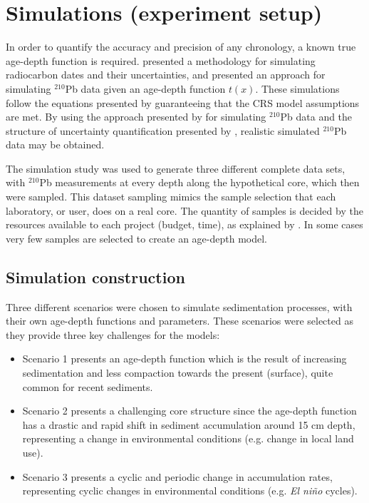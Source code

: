 \documentclass [10pt] {article}
\begin{document}
\section{Simulations (experiment setup)}

	In order to quantify the accuracy and precision of any chronology, a known true age-depth function is required.
\citet{Blaauw2018} presented a methodology for simulating radiocarbon dates and their uncertainties, and \citet{Aquino2018} presented an approach for simulating $^{210}$Pb data given an age-depth function $t(x)$.
These simulations follow the equations presented by \cite{Appleby1978, Robbins1978} guaranteeing that the CRS model assumptions are met. 
By using the approach presented by \citet{Aquino2018} for simulating $^{210}$Pb data and the structure of uncertainty quantification presented by \citet{Blaauw2018}, realistic simulated $^{210}$Pb data may be obtained.

	The simulation study was used to generate three different complete data sets, with $^{210}$Pb measurements at every depth along the hypothetical core, which then were sampled. 
This dataset sampling mimics the sample selection that each laboratory, or user, does on a real core.
The quantity of samples is decided by the resources available to each project (budget, time), as explained by \citet{Blaauw2018}. 
In some cases very few samples are selected to create an age-depth model.

\subsection{Simulation construction}\label{sec:SimConst}

Three different scenarios were chosen to simulate sedimentation processes, with their own age-depth functions and parameters. 
These scenarios were selected as they provide three key challenges for the models:
\begin{itemize}
\item Scenario 1 presents an age-depth function which is the result of increasing sedimentation and less compaction towards the present (surface), quite common for recent sediments. 
	
\item Scenario 2 presents a challenging core structure since the age-depth function has a drastic and rapid shift in sediment accumulation around 15 cm depth, representing a change in environmental conditions (e.g. change in local land use).
 
\item Scenario 3 presents a cyclic and periodic change in accumulation rates, representing cyclic changes in environmental conditions (e.g. \textit{El ni\~no} cycles). 
\end{itemize} 
\end{document}

